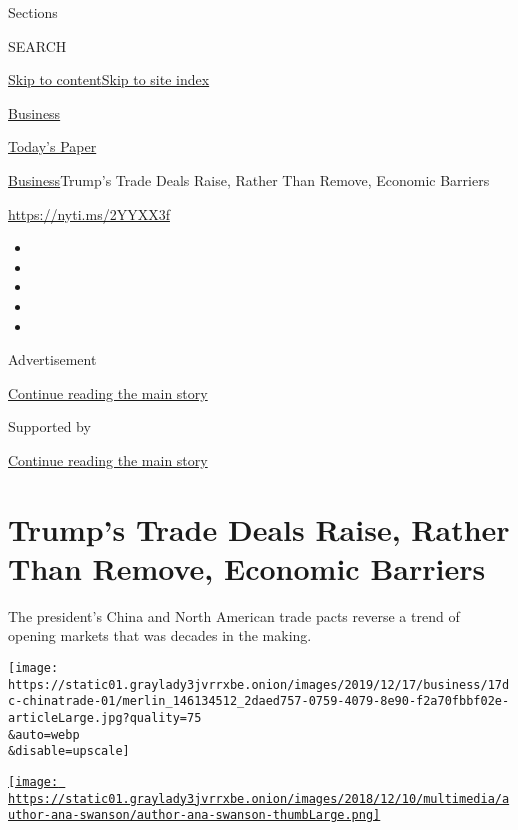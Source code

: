 Sections

SEARCH

\protect\hyperlink{site-content}{Skip to
content}\protect\hyperlink{site-index}{Skip to site index}

\href{https://www.nytimes3xbfgragh.onion/section/business}{Business}

\href{https://myaccount.nytimes3xbfgragh.onion/auth/login?response_type=cookie\&client_id=vi}{}

\href{https://www.nytimes3xbfgragh.onion/section/todayspaper}{Today's
Paper}

\href{/section/business}{Business}\textbar{}Trump's Trade Deals Raise,
Rather Than Remove, Economic Barriers

\url{https://nyti.ms/2YYXX3f}

\begin{itemize}
\item
\item
\item
\item
\item
\end{itemize}

Advertisement

\protect\hyperlink{after-top}{Continue reading the main story}

Supported by

\protect\hyperlink{after-sponsor}{Continue reading the main story}

\hypertarget{trumps-trade-deals-raise-rather-than-remove-economic-barriers}{%
\section{Trump's Trade Deals Raise, Rather Than Remove, Economic
Barriers}\label{trumps-trade-deals-raise-rather-than-remove-economic-barriers}}

The president's China and North American trade pacts reverse a trend of
opening markets that was decades in the making.

\texttt{[image: https://static01.graylady3jvrrxbe.onion/images/2019/12/17/business/17dc-chinatrade-01/merlin\_146134512\_2daed757-0759-4079-8e90-f2a70fbbf02e-articleLarge.jpg?quality=75\\\&auto=webp\\\&disable=upscale]}

\href{https://www.nytimes3xbfgragh.onion/by/ana-swanson}{\texttt{[image: https://static01.graylady3jvrrxbe.onion/images/2018/12/10/multimedia/author-ana-swanson/author-ana-swanson-thumbLarge.png]}}


